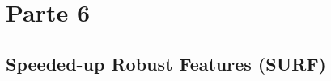 \chapter{Parte 6}
\label{c:parte6}

\vspace{1cm}

\newpage

\section{Speeded-up Robust Features (SURF)}


